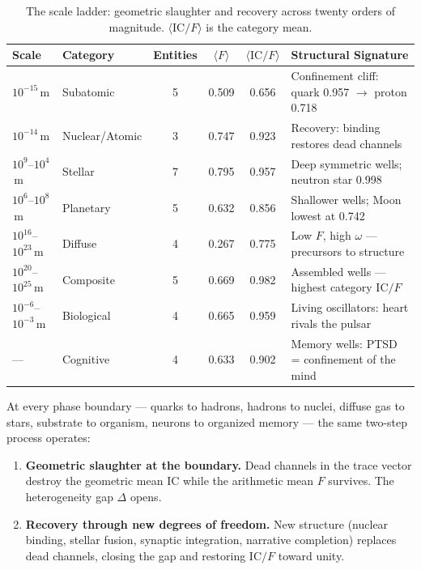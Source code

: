 \documentclass[
  aps,
  prd,
  twocolumn,
  superscriptaddress,
  nofootinbib,
  floatfix
]{revtex4-2}
\newcommand{\IC}{\mathrm{IC}}
\begin{document}
\clearpage
\begin{table}[t]
\caption{\label{tab:ladder}The scale ladder: geometric
slaughter and recovery across twenty orders of magnitude.
$\langle \IC/F \rangle$ is the category mean.}
\begin{ruledtabular}
\begin{tabular}{llcccl}
Scale & Category & Entities & $\langle F \rangle$ &
  $\langle \IC/F \rangle$ & Structural Signature \\
\hline
$10^{-15}$\,m & Subatomic &
  5 & 0.509 & 0.656 &
  Confinement cliff: quark 0.957 $\to$ proton 0.718 \\
$10^{-14}$\,m & Nuclear/Atomic &
  3 & 0.747 & 0.923 &
  Recovery: binding restores dead channels \\
$10^{9}$--$10^{4}$\,m & Stellar &
  7 & 0.795 & 0.957 &
  Deep symmetric wells; neutron star 0.998 \\
$10^{6}$--$10^{8}$\,m & Planetary &
  5 & 0.632 & 0.856 &
  Shallower wells; Moon lowest at 0.742 \\
$10^{16}$--$10^{23}$\,m & Diffuse &
  4 & 0.267 & 0.775 &
  Low $F$, high $\omega$ --- precursors to structure \\
$10^{20}$--$10^{25}$\,m & Composite &
  5 & 0.669 & 0.982 &
  Assembled wells --- highest category $\IC/F$ \\
$10^{-6}$--$10^{-3}$\,m & Biological &
  4 & 0.665 & 0.959 &
  Living oscillators: heart rivals the pulsar \\
--- & Cognitive &
  4 & 0.633 & 0.902 &
  Memory wells: PTSD = confinement of the mind \\
\end{tabular}
\end{ruledtabular}
\end{table}

At every phase boundary --- quarks to hadrons, hadrons to
nuclei, diffuse gas to stars, substrate to organism, neurons
to organized memory --- the same two-step process operates:

\begin{enumerate}
\item \textbf{Geometric slaughter at the boundary.}
  Dead channels in the trace vector destroy the geometric
  mean $\IC$ while the arithmetic mean $F$ survives.  The
  heterogeneity gap $\Delta$ opens.
\item \textbf{Recovery through new degrees of freedom.}
  New structure (nuclear binding, stellar fusion, synaptic
  integration, narrative completion) replaces dead channels,
  closing the gap and restoring $\IC/F$ toward unity.
\end{enumerate}
\end{document}
